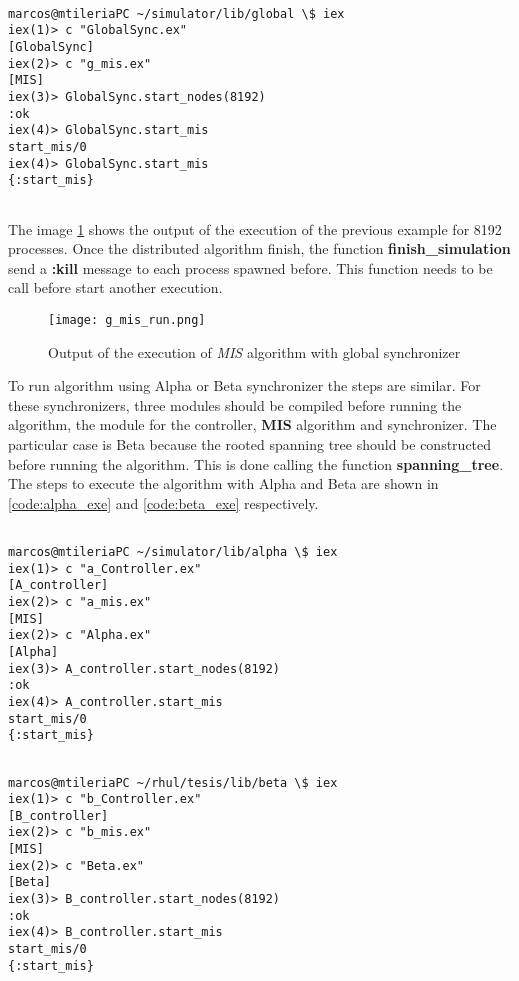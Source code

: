 \begin{lstlisting}[style=terminal]

marcos@mtileriaPC ~/simulator/lib/global \$ iex
iex(1)> c "GlobalSync.ex"
[GlobalSync]
iex(2)> c "g_mis.ex"     
[MIS]
iex(3)> GlobalSync.start_nodes(8192)
:ok
iex(4)> GlobalSync.start_mis        
start_mis/0    
iex(4)> GlobalSync.start_mis
{:start_mis}


\end{lstlisting}

 The image \ref{fig:gmis_run} shows the output of the execution of the previous example for 8192 processes. Once the distributed algorithm finish, the function \textbf{finish\_simulation} send a \textbf{:kill} message to each process spawned before. This function needs to be call before start another execution.



\begin{figure}[ht]
\centering
\texttt{[image: g\_mis\_run.png]} 
\caption{Output of the execution of \textit{MIS} algorithm with global synchronizer}
\label{fig:gmis_run}
\end{figure}

To run algorithm using Alpha or Beta synchronizer the steps are similar. For these synchronizers, three modules should be compiled before running the algorithm, the module for the controller, \textbf{MIS} algorithm and synchronizer. The particular case is Beta because the rooted spanning tree should be constructed before running the algorithm. This is done calling the function \textbf{spanning\_tree}. The steps to execute the algorithm with Alpha and Beta are shown in \ref{code:alpha_exe} and \ref{code:beta_exe} respectively.



\begin{lstlisting}[style=terminal,caption= Example of compiling and executing the algorithm with Alpha, label = code:alpha_exe]

marcos@mtileriaPC ~/simulator/lib/alpha \$ iex
iex(1)> c "a_Controller.ex"
[A_controller]
iex(2)> c "a_mis.ex"     
[MIS]
iex(2)> c "Alpha.ex"     
[Alpha]
iex(3)> A_controller.start_nodes(8192)
:ok
iex(4)> A_controller.start_mis        
start_mis/0    
{:start_mis}
\end{lstlisting}

\begin{lstlisting}[style=terminal,caption= Example of compiling and executing the algorithm with Beta, label = code:beta_exe]

marcos@mtileriaPC ~/rhul/tesis/lib/beta \$ iex
iex(1)> c "b_Controller.ex"
[B_controller]
iex(2)> c "b_mis.ex"     
[MIS]
iex(2)> c "Beta.ex"     
[Beta]
iex(3)> B_controller.start_nodes(8192)
:ok
iex(4)> B_controller.start_mis        
start_mis/0    
{:start_mis}

\end{lstlisting}

